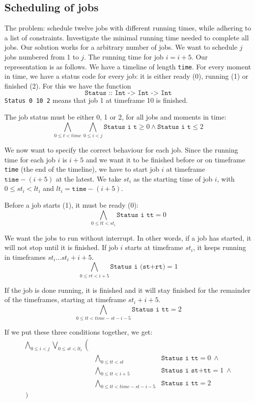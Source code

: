 \documentclass[12pt]{article}
\begin{document}
\subsection*{Scheduling of jobs}
The problem: schedule twelve jobs with different running times, while adhering to a list of constraints. Investigate the minimal running time needed to complete all jobs.
Our solution works for a arbitrary number of jobs. We want to schedule $j$ jobs numbered from 1 to $j$. The running time for job $i = i+5$.
Our representation is as follows. We have a timeline of length \texttt{time}. For every moment in time, we have a status code for every job: it is either ready (0), running (1) or finished (2). 
For this we have the function 
\[\texttt{Status :: Int -> Int -> Int}\]
\texttt{Status 0 10 2} means that job 1 at timeframe 10 is finished. 

The job status must be either 0, 1 or 2, for all jobs and moments in time:
\[ \bigwedge_{0 \le t < time} \bigwedge_{0 \le i < j} \texttt{Status i t} \ge 0\wedge \texttt{Status i t} \le 2\]

We now want to specify the correct behaviour for each job. 
Since the running time for each job $i$ is $i+5$ and we want it to be finished before or on timeframe \texttt{time} (the end of the timeline), we have to start job $i$ at timeframe $\texttt{time}-(i+5)$ at the latest.
We take $st_i$ as the starting time of job $i$, with $0 \le st_i < lt_i$ and $lt_i = \texttt{time}-(i+5)$.

Before a job starts (1), it must be ready (0):
\[ \bigwedge_{0 \le tt < st_i} \texttt{Status i tt} = 0 \]

We want the jobs to run without interrupt.
In other words, if a job has started, it will not stop until it is finished. 
If job $i$ starts at timeframe $st_i$, it keeps running in timeframes $st_i \dots st_i + i + 5$.
\[ \bigwedge_{0 \le rt < i+5} \texttt{Status i (st+rt)} = 1 \]

If the job is done running, it is finished and it will stay finished for the remainder of the timeframes, starting at timeframe $st_i + i + 5$.
\[ \bigwedge_{0 \le tt < time-st-i-5} \texttt{Status i tt} = 2 \]

If we put these three conditions together, we get:
\[ \begin{array}{rll}
    \bigwedge_{0 \le i < j} \bigvee_{0 \le st < lt_i} \left( \right.&& \\
    & \bigwedge_{0 \le tt < st} & \texttt{Status i tt} = 0 ~ \wedge \\
    & \bigwedge_{0 \le tt < i+5} & \texttt{Status i st+tt} = 1 ~ \wedge \\
    & \bigwedge_{0 \le tt < time-st-i-5} & \texttt{Status i tt} = 2 \\
\left. \right)
\end{array} \]
\end{document}
